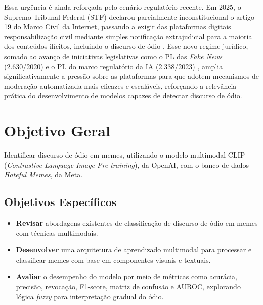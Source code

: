 Essa urgência é ainda reforçada pelo cenário regulatório recente. Em 2025, o Supremo Tribunal Federal (STF) declarou parcialmente inconstitucional o artigo 19 do Marco Civil da Internet, passando a exigir das plataformas digitais responsabilização civil mediante simples notificação extrajudicial para a maioria dos conteúdos ilícitos, incluindo o discurso de ódio \cite{STF2025}. Esse novo regime jurídico, somado ao avanço de iniciativas legislativas como o PL das \textit{Fake News} (2.630/2020) e o PL do marco regulatório da IA (2.338/2023) \cite{GovBR2025}, amplia significativamente a pressão sobre as plataformas para que adotem mecanismos de moderação automatizada mais eficazes e escaláveis, reforçando a relevância prática do desenvolvimento de modelos capazes de detectar discurso de ódio.


\section{Objetivo Geral}

Identificar discurso de ódio em memes, utilizando o modelo multimodal CLIP (\textit{Contrastive Language-Image Pre-training}), da OpenAI, com o banco de dados \textit{Hateful Memes}, da Meta.

\subsection{Objetivos Específicos}

\begin{itemize}
    \item \textbf{Revisar} abordagens existentes de classificação de discurso de ódio em memes com técnicas multimodais.
    \item \textbf{Desenvolver} uma arquitetura de aprendizado multimodal para processar e classificar memes com base em componentes visuais e textuais.
    \item \textbf{Avaliar} o desempenho do modelo por meio de métricas como acurácia, precisão, revocação, F1-score, matriz de confusão e AUROC, explorando lógica \textit{fuzzy} para interpretação gradual do ódio.
\end{itemize}



